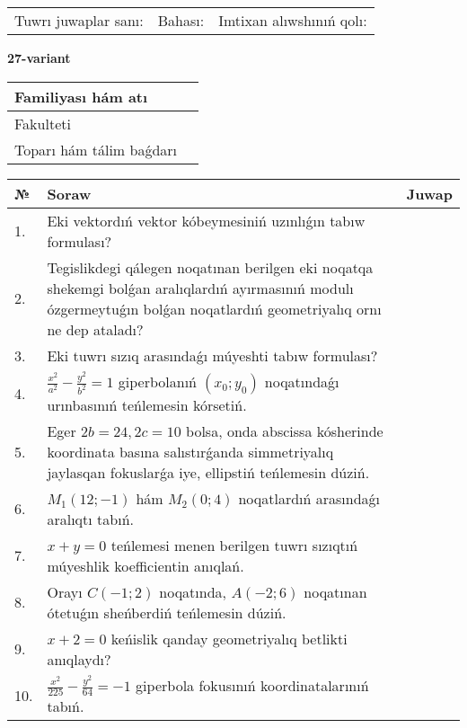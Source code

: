 \documentclass{article}
\begin{document}
\vspace{1cm}

\begin{tabular}{lll}
Tuwrı juwaplar sanı: \underline{\hspace{1.5cm}} & 
Bahası: \underline{\hspace{1.5cm}} & 
Imtixan alıwshınıń qolı: \underline{\hspace{2cm}} \\
\end{tabular}

\egroup

\newpage


\textbf{27-variant}\\

\bgroup
\def\arraystretch{1.6} %

\begin{tabular}{|m{5.7cm}|m{9.5cm}|}
\hline
Familiyası hám atı & \\
\hline
Fakulteti  & \\
\hline
Toparı hám tálim baǵdarı  & \\
\hline
\end{tabular}

\vspace{1cm}

\begin{tabular}{|m{0.7cm}|m{10cm}|m{4cm}|}
\hline
№ & Soraw & Juwap \\
\hline
1. & Eki vektordıń vektor kóbeymesiniń uzınlıǵın tabıw formulası? &  \\
\hline
2. & Tegislikdegi qálegen noqatınan berilgen eki noqatqa shekemgi bolǵan aralıqlardıń ayırmasınıń modulı ózgermeytuǵın bolǵan noqatlardıń geometriyalıq ornı ne dep ataladı? &  \\
\hline
3. & Eki tuwrı sızıq arasındaǵı múyeshti tabıw formulası? &  \\
\hline
4. & $\frac{x^2}{a^2}-\frac{y^2}{b^2}=1$ giperbolanıń $(x_0;y_0)$ noqatındaǵı urınbasınıń teńlemesin kórsetiń. &  \\
\hline
5. & Eger $2b=24, 2 c=10$ bolsa, onda abscissa kósherinde koordinata basına salıstırǵanda simmetriyalıq jaylasqan fokuslarǵa iye, ellipstiń teńlemesin dúziń. &  \\
\hline
6. & $M_{1} (12;-1)$ hám $M_{2} (0;4)$ noqatlardıń arasındaǵı aralıqtı tabıń. &  \\
\hline
7. & $x+y=0$ teńlemesi menen berilgen tuwrı sızıqtıń múyeshlik koefficientin anıqlań. &  \\
\hline
8. & Orayı $C (-1;2)$ noqatında, $A (-2;6 )$ noqatınan ótetuǵın sheńberdiń teńlemesin dúziń. &  \\
\hline
9. & $x+2=0$ keńislik qanday geometriyalıq betlikti anıqlaydı? &  \\
\hline
10. & $\frac{x^{2}}{225}-\frac{y^{2}}{64}=-1$ giperbola fokusınıń koordinatalarınıń tabıń. &  \\
\hline
\end{tabular}
\end{document}
